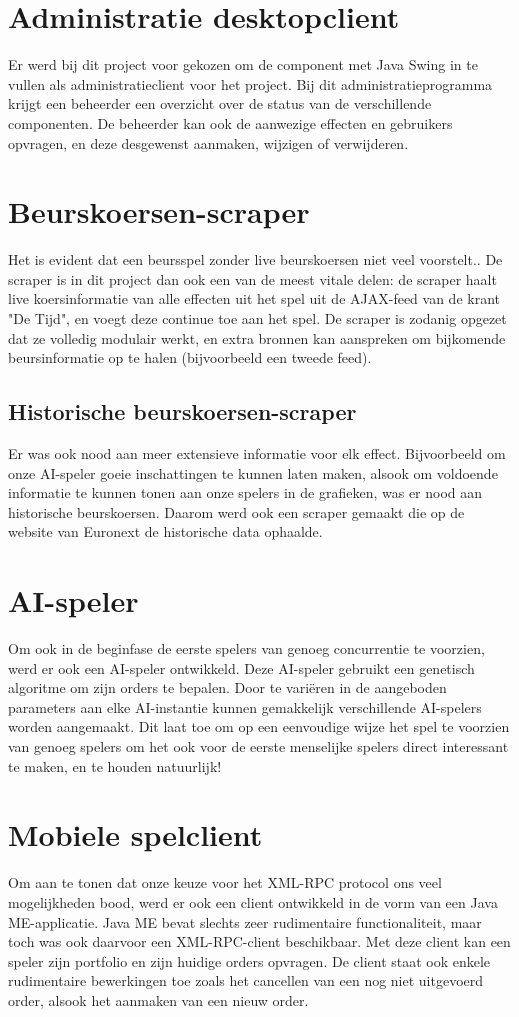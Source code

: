 \section{Administratie desktopclient}
Er werd bij dit project voor gekozen om de component met Java Swing in te vullen als administratieclient voor het project. Bij dit administratieprogramma krijgt een beheerder een overzicht over de status van de verschillende componenten. De beheerder kan ook de aanwezige effecten en gebruikers opvragen, en deze desgewenst aanmaken, wijzigen of verwijderen.

\section{Beurskoersen-scraper}
Het is evident dat een beursspel zonder live beurskoersen niet veel voorstelt.. De scraper is in dit project dan ook een van de meest vitale delen: de scraper haalt live koersinformatie van alle effecten uit het spel uit de AJAX-feed van de krant "De Tijd", en voegt deze continue toe aan het spel. De scraper is zodanig opgezet dat ze volledig modulair werkt, en extra bronnen kan aanspreken om bijkomende beursinformatie op te halen (bijvoorbeeld een tweede feed).
\subsection{Historische beurskoersen-scraper}
Er was ook nood aan meer extensieve informatie voor elk effect. Bijvoorbeeld om onze AI-speler goeie inschattingen te kunnen laten maken, alsook om voldoende informatie te kunnen tonen aan onze spelers in de grafieken, was er nood aan historische beurskoersen. Daarom werd ook een scraper gemaakt die op de website van Euronext de historische data ophaalde.

\section{AI-speler}
Om ook in de beginfase de eerste spelers van genoeg concurrentie te voorzien, werd er ook een AI-speler ontwikkeld. Deze AI-speler gebruikt een genetisch algoritme om zijn orders te bepalen. Door te vari\"eren in de aangeboden parameters aan elke AI-instantie kunnen gemakkelijk verschillende AI-spelers worden aangemaakt. Dit laat toe om op een eenvoudige wijze het spel te voorzien van genoeg spelers om het ook voor de eerste menselijke spelers direct interessant te maken, en te houden natuurlijk!

\section{Mobiele spelclient}
Om aan te tonen dat onze keuze voor het XML-RPC protocol ons veel mogelijkheden bood, werd er ook een client ontwikkeld in de vorm van een Java ME-applicatie. Java ME bevat slechts zeer rudimentaire functionaliteit, maar toch was ook daarvoor een XML-RPC-client beschikbaar.
Met deze client kan een speler zijn portfolio en zijn huidige orders opvragen. De client staat ook enkele rudimentaire bewerkingen toe zoals het cancellen van een nog niet uitgevoerd order, alsook het aanmaken van een nieuw order.

